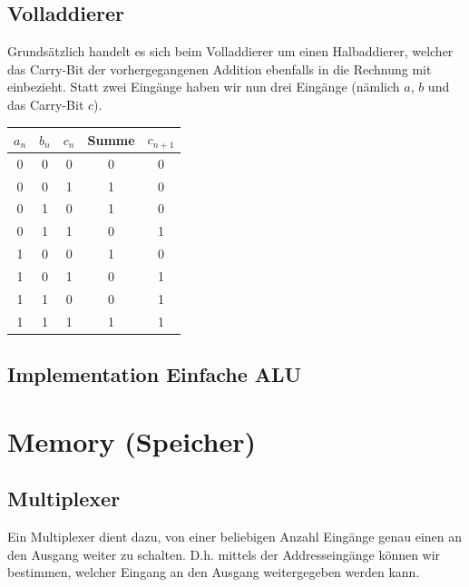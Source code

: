 \documentclass{report}
\begin{document}
\subsection{Volladdierer}

Grundsätzlich handelt es sich beim Volladdierer um einen Halbaddierer, welcher das Carry-Bit der vorhergegangenen Addition ebenfalls in die Rechnung mit einbezieht. Statt zwei Eingänge haben wir nun drei Eingänge (nämlich $a$, $b$ und das Carry-Bit $c$).

\begin{center}\begin{tabular}{c c c | c c}
$a_n$ & $b_n$ & $c_n$ & Summe & $c_{n+1}$ \\ \hline
0 & 0 & 0 & 0 & 0\\
0 & 0 & 1 & 1 & 0\\
0 & 1 & 0 & 1 & 0\\
0 & 1 & 1 & 0 & 1\\
1 & 0 & 0 & 1 & 0\\
1 & 0 & 1 & 0 & 1\\
1 & 1 & 0 & 0 & 1\\
1 & 1 & 1 & 1 & 1\\
\end{tabular}\end{center}
\subsection{Implementation Einfache ALU}
\section{Memory (Speicher)}
\subsection{Multiplexer}
Ein Multiplexer dient dazu, von einer beliebigen Anzahl Eingänge genau einen an den Ausgang weiter zu schalten. D.h. mittels der Addresseingänge können wir bestimmen, welcher Eingang an den Ausgang weitergegeben werden kann.
\end{document}
